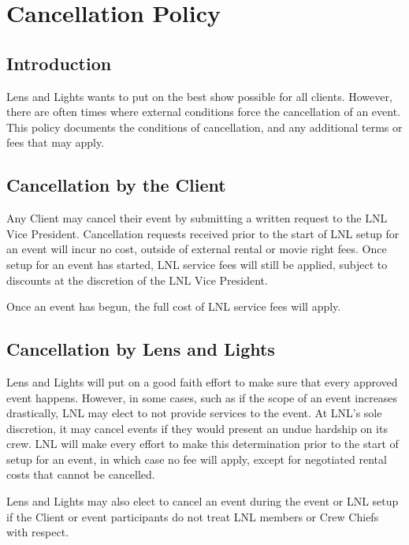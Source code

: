 \chapter{Cancellation Policy}

\section{Introduction} 
Lens and Lights wants to put on the best show possible for all clients. However,
there are often times where external conditions force the cancellation of an
event. This policy documents the conditions of cancellation, and any additional
terms or fees that may apply.

\section{Cancellation by the Client}
Any Client may cancel their event by submitting a written request to the LNL
Vice President. Cancellation requests received prior to the start of LNL setup
for an event will incur no cost, outside of external rental or movie right fees.
Once setup for an event has started, LNL service fees will still be applied,
subject to discounts at the discretion of the LNL Vice President.

Once an event has begun, the full cost of LNL service fees will apply.

\section{Cancellation by Lens and Lights}
Lens and Lights will put on a good faith effort to make sure that every approved
event happens. However, in some cases, such as if the scope of an event
increases drastically, LNL may elect to not provide services to the event. At
LNL’s sole discretion, it may cancel events if they would present an undue
hardship on its crew. LNL will make every effort to make this determination
prior to the start of setup for an event, in which case no fee will apply,
except for negotiated rental costs that cannot be cancelled.

Lens and Lights may also elect to cancel an event during the event or LNL setup
if the Client or event participants do not treat LNL members or Crew Chiefs with
respect.
